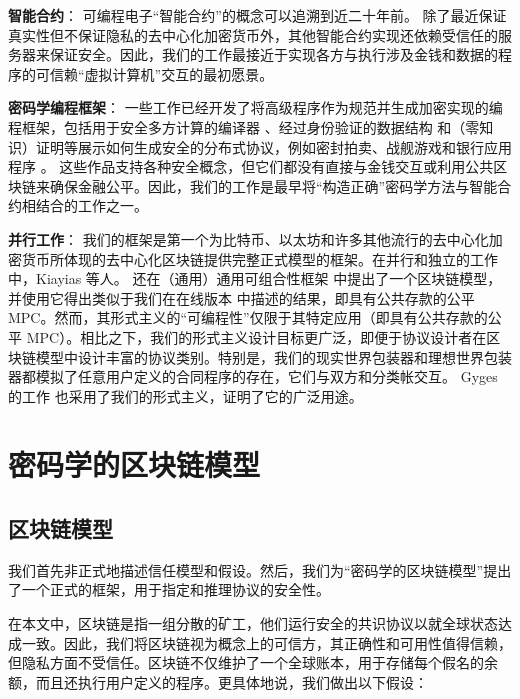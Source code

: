 \documentclass{xduugtrans}
\begin{document}
\textbf{智能合约}：
可编程电子“智能合约”的概念可以追溯到近二十年前\cite{ref53}。 除了最近保证真实性但不保证隐私的去中心化加密货币外，其他智能合约实现还依赖受信任的服务器来保证安全\cite{ref46}。因此，我们的工作最接近于实现各方与执行涉及金钱和数据的程序的可信赖“虚拟计算机”交互的最初愿景。

\textbf{密码学编程框架}：
一些工作已经开发了将高级程序作为规范并生成加密实现的编程框架，包括用于安全多方计算的编译器 \cite{ref19}\cite{ref39}\cite{ref41}\cite{ref51}、经过身份验证的数据结构 \cite{ref44} 和（零知识）证明\cite{ref12}\cite{ref30}\cite{ref31}\cite{ref49}等展示如何生成安全的分布式协议，例如密封拍卖、战舰游戏和银行应用程序 \cite{ref58}。 这些作品支持各种安全概念，但它们都没有直接与金钱交互或利用公共区块链来确保金融公平。因此，我们的工作是最早将“构造正确”密码学方法与智能合约相结合的工作之一。

\textbf{并行工作}：
我们的框架是第一个为比特币、以太坊和许多其他流行的去中心化加密货币所体现的去中心化区块链提供完整正式模型的框架。在并行和独立的工作中，Kiayias 等人。 \cite{ref36} 还在（通用）通用可组合性框架 \cite{ref23} 中提出了一个区块链模型，并使用它得出类似于我们在在线版本 \cite{ref37} 中描述的结果，即具有公共存款的公平 MPC。然而，其形式主义的“可编程性”仅限于其特定应用（即具有公共存款的公平 MPC）。相比之下，我们的形式主义设计目标更广泛，即便于协议设计者在区块链模型中设计丰富的协议类别。特别是，我们的现实世界包装器和理想世界包装器都模拟了任意用户定义的合同程序的存在，它们与双方和分类帐交互。 Gyges 的工作 \cite{ref35} 也采用了我们的形式主义，证明了它的广泛用途。

\chapter{密码学的区块链模型}

\section{区块链模型}

我们首先非正式地描述信任模型和假设。然后，我们为“密码学的区块链模型”提出了一个正式的框架，用于指定和推理协议的安全性。

在本文中，区块链是指一组分散的矿工，他们运行安全的共识协议以就全球状态达成一致。因此，我们将区块链视为概念上的可信方，其正确性和可用性值得信赖，但隐私方面不受信任。区块链不仅维护了一个全球账本，用于存储每个假名的余额，而且还执行用户定义的程序。更具体地说，我们做出以下假设：
\end{document}
